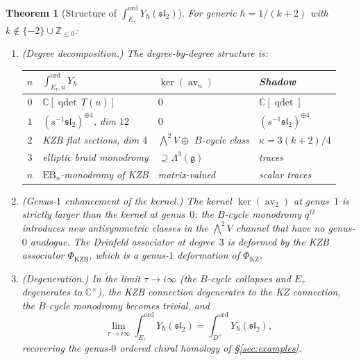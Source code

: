 \documentclass[11pt,reqno]{amsart}
\newtheorem{theorem}{Theorem}[section]
\theoremstyle{definition}
\theoremstyle{remark}
\DeclareMathOperator{\av}{av}
\newcommand{\fg}{\mathfrak{g}}
\newcommand{\CC}{\mathbb{C}}
\newcommand{\ZZ}{\mathbb{Z}}
\numberwithin{equation}{section}
\begin{document}
\begin{theorem}[Structure of
$\int_{E_\tau}^{\mathrm{ord}}
Y_\hbar(\mathfrak{sl}_2)$]
\label{thm:ell-ordered-ch}
For generic $\hbar = 1/(k+2)$ with $k \notin \{-2\}
\cup \ZZ_{\leq 0}$:
\begin{enumerate}[label=\textup{(\roman*)}]
\item \textup{(Degree decomposition.)}
  The degree-by-degree structure is:
  \begin{center}
  \renewcommand{\arraystretch}{1.3}
  \begin{tabular}{@{} c l l l @{}}
  \toprule
  $n$ & $\int_{E_\tau, n}^{\mathrm{ord}}
  Y_\hbar$ & $\ker(\av_n)$ & Shadow \\
  \midrule
  $0$ & $\CC[\operatorname{qdet}\,T(u)]$
    & $0$ & $\CC[\operatorname{qdet}]$ \\
  $1$ & $(s^{-1}\mathfrak{sl}_2)^{\oplus 4}$,
    dim $12$ & $0$
    & $(s^{-1}\mathfrak{sl}_2)^{\oplus 4}$ \\
  $2$ & KZB flat sections, dim $4$
    & $\bigwedge^2 V \oplus$ $B$-cycle class
    & $\kappa = 3(k{+}2)/4$ \\
  $3$ & elliptic braid monodromy
    & $\supseteq \Lambda^3(\fg)$
    & traces \\
  $n$ & $\mathrm{EB}_n$-monodromy of KZB
    & matrix-valued
    & scalar traces \\
  \bottomrule
  \end{tabular}
  \end{center}

\item \textup{(Genus-$1$ enhancement of the kernel.)}
  The kernel $\ker(\av_2)$ at genus~$1$ is strictly larger
  than the kernel at genus~$0$: the $B$-cycle monodromy
  $q^{\Omega}$ introduces new antisymmetric classes in the
  $\bigwedge^2 V$ channel that have no genus-$0$ analogue.
  The Drinfeld associator at degree~$3$ is deformed by the
  KZB associator $\Phi_{\mathrm{KZB}}$, which is a genus-$1$
  deformation of $\Phi_{\mathrm{KZ}}$.

\item \textup{(Degeneration.)}
  In the limit $\tau \to i\infty$
  \textup{(}the $B$-cycle collapses and $E_\tau$ degenerates to
  $\CC^\times$\textup{)}, the KZB connection
  degenerates to the KZ connection, the $B$-cycle monodromy
  becomes trivial, and
  \begin{equation}\label{eq:ell-degen}
    \lim_{\tau \to i\infty}
    \int_{E_\tau}^{\mathrm{ord}}
    Y_\hbar(\mathfrak{sl}_2)
    = \int_{D^\times}^{\mathrm{ord}}
    Y_\hbar(\mathfrak{sl}_2),
  \end{equation}
  recovering the genus-$0$ ordered chiral homology of
  \S\textup{\ref{sec:examples}}.


\end{enumerate}
\end{theorem}
\end{document}
